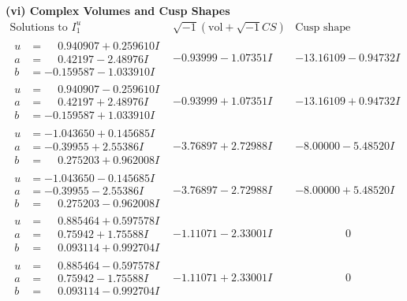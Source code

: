 \documentclass[1p]{elsarticle_modified}
\theoremstyle{definition}
\newcommand{\I}{\sqrt{-1}}
\begin{document}
\newpage\flushleft \textbf{(vi) Complex Volumes and Cusp Shapes}
$$\begin{array}{c|c|c}  
\text{Solutions to }I^u_{1}& \I (\text{vol} + \sqrt{-1}CS) & \text{Cusp shape}\\
 \hline 
\begin{aligned}
u &= \phantom{-}0.940907 + 0.259610 I \\
a &= \phantom{-}0.42197 - 2.48976 I \\
b &= -0.159587 - 1.033910 I\end{aligned}
 & -0.93999 - 1.07351 I & -13.16109 - 0.94732 I \\ \hline\begin{aligned}
u &= \phantom{-}0.940907 - 0.259610 I \\
a &= \phantom{-}0.42197 + 2.48976 I \\
b &= -0.159587 + 1.033910 I\end{aligned}
 & -0.93999 + 1.07351 I & -13.16109 + 0.94732 I \\ \hline\begin{aligned}
u &= -1.043650 + 0.145685 I \\
a &= -0.39955 + 2.55386 I \\
b &= \phantom{-}0.275203 + 0.962008 I\end{aligned}
 & -3.76897 + 2.72988 I & -8.00000 - 5.48520 I \\ \hline\begin{aligned}
u &= -1.043650 - 0.145685 I \\
a &= -0.39955 - 2.55386 I \\
b &= \phantom{-}0.275203 - 0.962008 I\end{aligned}
 & -3.76897 - 2.72988 I & -8.00000 + 5.48520 I \\ \hline\begin{aligned}
u &= \phantom{-}0.885464 + 0.597578 I \\
a &= \phantom{-}0.75942 + 1.75588 I \\
b &= \phantom{-}0.093114 + 0.992704 I\end{aligned}
 & -1.11071 - 2.33001 I & \phantom{-0.000000 } 0 \\ \hline\begin{aligned}
u &= \phantom{-}0.885464 - 0.597578 I \\
a &= \phantom{-}0.75942 - 1.75588 I \\
b &= \phantom{-}0.093114 - 0.992704 I\end{aligned}
 & -1.11071 + 2.33001 I & \phantom{-0.000000 } 0 \\ \hline\begin{aligned}

\end{aligned}
\end{array}$$
\end{document}
